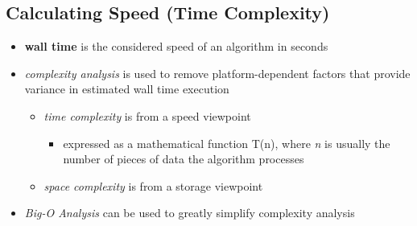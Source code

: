 \documentclass[11pt]{article}
\begin{document}
\subsection{Calculating Speed (Time Complexity)}
\label{sec:orga85943a}
\begin{itemize}
\item \textbf{wall time} is the considered speed of an algorithm in seconds
\item \emph{complexity analysis} is used to remove platform-dependent factors that provide variance in estimated wall time execution
\begin{itemize}
\item \emph{time complexity} is from a speed viewpoint
\begin{itemize}
\item expressed as a mathematical function T(n), where \emph{n} is usually the number of pieces of data the algorithm processes
\end{itemize}
\item \emph{space complexity} is from a storage viewpoint
\end{itemize}
\item \emph{Big-O Analysis} can be used to greatly simplify complexity analysis
\end{itemize}
\end{document}
